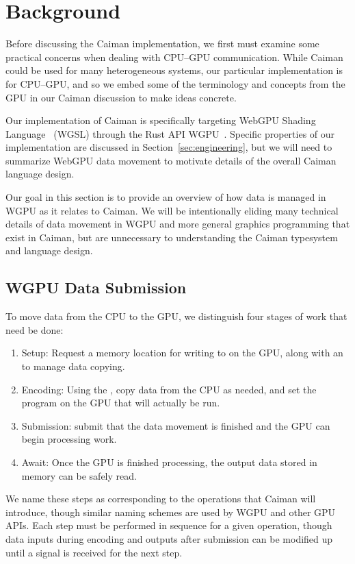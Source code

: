 \section{Background}
\label{sec:background}

Before discussing the Caiman implementation, we first must examine some practical concerns when dealing with CPU--GPU communication.  While Caiman could be used for many heterogeneous systems, our particular implementation is for CPU--GPU, and so we embed some of the terminology and concepts from the GPU in our Caiman discussion to make ideas concrete.

Our implementation of Caiman is specifically targeting WebGPU Shading Language~\cite{webgsl} (WGSL) through the Rust API WGPU~\cite{wgpu}.  Specific properties of our implementation are discussed in Section~\ref{sec:engineering}, but we will need to summarize WebGPU data movement to motivate details of the overall Caiman language design.

Our goal in this section is to provide an overview of how data is managed in WGPU as it relates to Caiman.  We will be intentionally eliding many technical details of data movement in WGPU and more general graphics programming that exist in Caiman, but are unnecessary to understanding the Caiman typesystem and language design.

\subsection{WGPU Data Submission}
\label{subsec:submission}

To move data from the CPU to the GPU, we distinguish four stages of work that need be done:

\begin{enumerate}
\item Setup: Request a memory location for writing to on the GPU, along with an  to manage data copying.
\item Encoding: Using the , copy data from the CPU as needed, and set the program on the GPU that will actually be run.
\item Submission: submit that the data movement is finished and the GPU can begin processing work.
\item Await: Once the GPU is finished processing, the output data stored in memory can be safely read.
\end{enumerate}

We name these steps as corresponding to the operations that Caiman will introduce, though similar naming schemes are used by WGPU and other GPU APIs.  Each step must be performed in sequence for a given operation, though data inputs during encoding and outputs after submission can be modified up until a signal is received for the next step.

